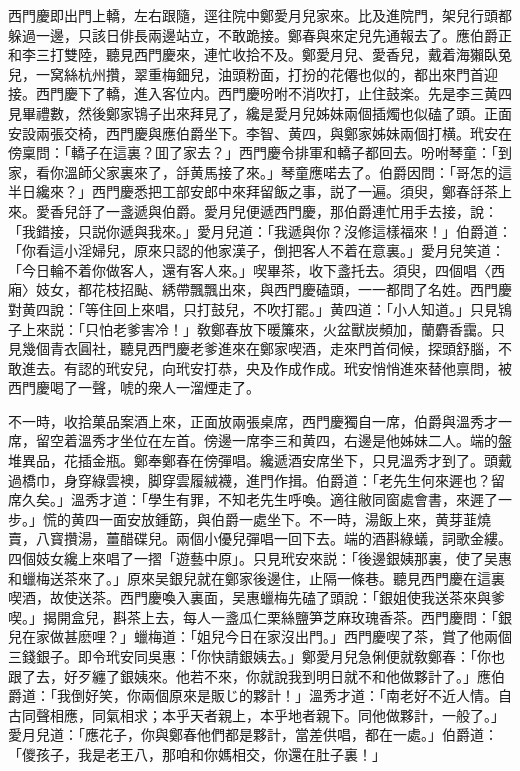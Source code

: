 西門慶即出門上轎，左右跟隨，逕往院中鄭愛月兒家來。比及進院門，架兒行頭都躲過一邊，只該日俳長兩邊站立，不敢跪接。鄭春與來定兒先通報去了。應伯爵正和李三打雙陸，聽見西門慶來，連忙收拾不及。鄭愛月兒、愛香兒，戴着海獺臥兔兒，一窝絲杭州攢，翠重梅鈿兒，油頭粉面，打扮的花僊也似的，都出來門首迎接。西門慶下了轎，進入客位内。西門慶吩咐不消吹打，止住鼓楽。先是李三黄四見畢禮數，然後鄭家鴇子出來拜見了，纔是愛月兒姊妹兩個插燭也似磕了頭。正面安設兩張交椅，西門慶與應伯爵坐下。李智、黄四，與鄭家姊妹兩個打横。玳安在傍稟問：「轎子在這裏？囬了家去？」西門慶令排軍和轎子都回去。吩咐琴童：「到家，看你溫師父家裏來了，㧱黄馬接了來。」琴童應喏去了。伯爵因問：「哥怎的這半日纔來？」西門慶悉把工部安郎中來拜留飯之事，説了一遍。須臾，鄭春㧱茶上來。愛香兒㧱了一盞遞與伯爵。愛月兒便遞西門慶，那伯爵連忙用手去接，說：「我錯接，只説你遞與我來。」愛月兒道：「我遞與你？沒修這樣福來！」伯爵道：「你看這小淫婦兒，原來只認的他家漢子，倒把客人不着在意裏。」愛月兒笑道：「今日輪不着你做客人，還有客人來。」喫畢茶，收下盞托去。須臾，四個唱〈西廂〉妓女，都花枝招颭、綉帶飄飄出來，與西門慶磕頭，一一都問了名姓。西門慶對黄四說：「等住回上來唱，只打鼓兒，不吹打罷。」黄四道：「小人知道。」只見鴇子上來説：「只怕老爹害冷！」敎鄭春放下暖簾來，火盆獸炭頻加，蘭麝香靄。只見幾個青衣圓社，聽見西門慶老爹進來在鄭家喫酒，走來門首伺候，探頭舒腦，不敢進去。有認的玳安兒，向玳安打恭，央及作成作成。玳安悄悄進來替他禀問，被西門慶喝了一聲，唬的衆人一溜煙走了。

不一時，收拾菓品案酒上來，正面放兩張桌席，西門慶獨自一席，伯爵與溫秀才一席，留空着溫秀才坐位在左首。傍邊一席李三和黄四，右邊是他姊妹二人。端的盤堆異品，花插金瓶。鄭奉鄭春在傍彈唱。纔遞酒安席坐下，只見溫秀才到了。頭戴過橋巾，身穿綠雲襖，脚穿雲履絨襪，進門作揖。伯爵道：「老先生何來遲也？留席久矣。」溫秀才道：「學生有罪，不知老先生呼喚。適往敝同窗處會書，來遲了一步。」慌的黄四一面安放鍾筯，與伯爵一處坐下。不一時，湯飯上來，黄芽韮燒賣，八寳攢湯，薑醋碟兒。兩個小優兒彈唱一回下去。端的酒斟綠蟻，詞歌金縷。四個妓女纔上來唱了一摺「遊藝中原」。只見玳安來説：「後邊銀姨那裏，使了吴惠和蠟梅送茶來了。」原來吴銀兒就在鄭家後邊住，止隔一條巷。聽見西門慶在這裏喫酒，故使送茶。西門慶喚入裏面，吴惠蠟梅先磕了頭說：「銀姐使我送茶來與爹喫。」揭開盒兒，斟茶上去，每人一盞瓜仁栗絲鹽笋芝麻玫瑰香茶。西門慶問：「銀兒在家做甚麽哩？」蠟梅道：「姐兒今日在家沒出門。」西門慶喫了茶，賞了他兩個三錢銀子。即令玳安同吳惠：「你快請銀姨去。」鄭愛月兒急俐便就敎鄭春：「你也跟了去，好歹纏了銀姨來。他若不來，你就說我到明日就不和他做夥計了。」應伯爵道：「我倒好笑，你兩個原來是販じ的夥計！」溫秀才道：「南老好不近人情。自古同聲相應，同氣相求；本乎天者親上，本乎地者親下。同他做夥計，一般了。」愛月兒道：「應花子，你與鄭春他們都是夥計，當差供唱，都在一處。」伯爵道：「儍孩子，我是老王八，那咱和你媽相交，你還在肚子裏！」

